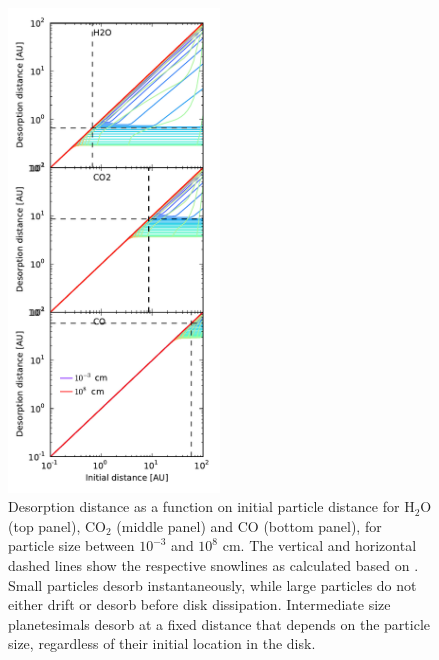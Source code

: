 \documentclass[12pt, preprint]{aastex}
\begin{document}
\begin{figure}[htb]
\centering
\includegraphics[width=0.5\textwidth]{figs/desorption_distance_many_new_2.pdf}
\caption{Desorption distance as a function on initial particle distance for H$_2$O (top panel), CO$_2$ (middle panel) and CO (bottom panel), for particle size between $10^{-3}$ and $10^8$ cm. The vertical and horizontal dashed lines show the respective snowlines as calculated based on \citet{hollenbach09}. Small particles desorb instantaneously, while large particles do not either drift or desorb before disk dissipation. Intermediate size planetesimals desorb at a fixed distance that depends on the particle size, regardless of their initial location in the disk.} %
\label{fig:drift_dist}
\end{figure}
\end{document}
